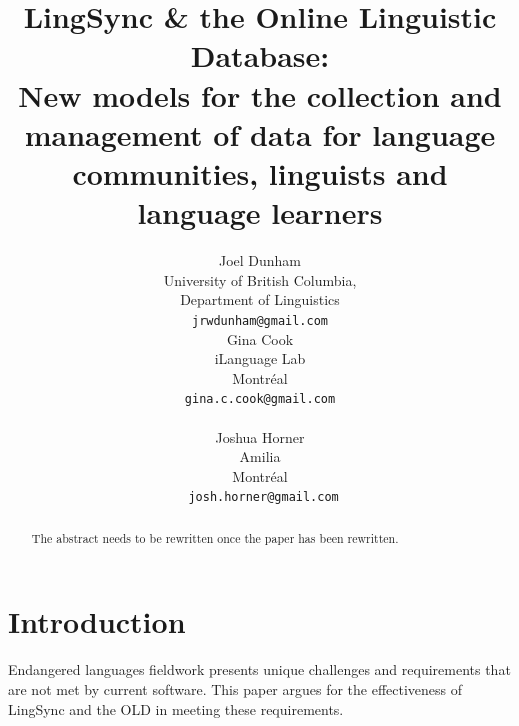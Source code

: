 \documentclass[11pt]{article}
\title{LingSync \& the Online Linguistic Database:\\New models for the
    collection and management of data for language communities, linguists and
language learners}
\author{Joel Dunham \\
University of British Columbia,   \\
Department of Linguistics \\
{\tt jrwdunham@gmail.com} \\\And
Gina Cook \\
iLanguage Lab \\
Montr\'eal \\
{\tt gina.c.cook@gmail.com} \\  \\\And
Joshua Horner \\
Amilia  \\
Montr\'eal \\
{\tt ~josh.horner@gmail.com} \\ }
\date{}
\begin{document}
\maketitle
\tableofcontents

\begin{abstract}
The abstract needs to be rewritten once the paper has been rewritten.
\end{abstract}

\section{Introduction}

Endangered languages fieldwork presents unique challenges and requirements that
are not met by current software. This paper argues for the effectiveness of
LingSync and the OLD in meeting these requirements.
\end{document}
